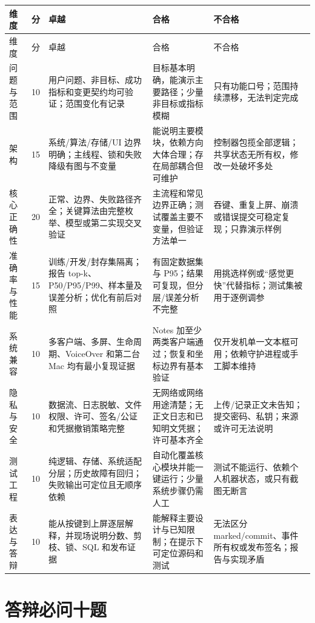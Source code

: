 {\small
\setlength{\tabcolsep}{3pt}
\begin{longtable}{p{2.1cm}p{.8cm}p{3.25cm}p{3.25cm}p{3.25cm}}
\toprule
维度 & 分 & 卓越 & 合格 & 不合格 \\
\midrule
\endfirsthead
\toprule
维度 & 分 & 卓越 & 合格 & 不合格 \\
\midrule
\endhead
问题与范围 & 10 & 用户问题、非目标、成功指标和变更契约均可验证；范围变化有记录 & 目标基本明确，能演示主要路径；少量非目标或指标模糊 & 只有功能口号；范围持续漂移，无法判定完成 \\
架构 & 15 & 系统/算法/存储/UI 边界明确；主线程、锁和失败降级有图与不变量 & 能说明主要模块，依赖方向大体合理；存在局部耦合但可维护 & 控制器包揽全部逻辑；共享状态无所有权，修改一处破坏多处 \\
核心正确性 & 20 & 正常、边界、失败路径齐全；关键算法由完整枚举、模型或第二实现交叉验证 & 主流程和常见边界正确；测试覆盖主要不变量，但验证方法单一 & 吞键、重复上屏、崩溃或错误提交可稳定复现；只靠演示样例 \\
准确率与性能 & 15 & 训练/开发/封存集隔离；报告 top-k、P50/P95/P99、样本量及误差分析；优化有前后对照 & 有固定数据集与 P95；结果可复现，但分层/误差分析不完整 & 用挑选样例或“感觉更快”代替指标；测试集被用于逐例调参 \\
系统兼容 & 10 & 多客户端、多屏、生命周期、VoiceOver 和第二台 Mac 均有最小复现证据 & Notes 加至少两类客户端通过；恢复和坐标边界有基本验证 & 仅开发机单一文本框可用；依赖守护进程或手工脚本维持 \\
隐私与安全 & 10 & 数据流、日志脱敏、文件权限、许可、签名/公证和凭据撤销策略完整 & 无网络或网络用途清楚；无正文日志和已知明文凭据；许可基本齐全 & 上传/记录正文未告知；提交密码、私钥；来源或许可无法说明 \\
测试工程 & 10 & 纯逻辑、存储、系统适配分层；历史故障有回归；失败输出可定位且无顺序依赖 & 自动化覆盖核心模块并能一键运行；少量系统步骤仍需人工 & 测试不能运行、依赖个人机器状态，或只有截图无断言 \\
表达与答辩 & 10 & 能从按键到上屏逐层解释，并现场说明分数、剪枝、锁、SQL 和发布证据 & 能解释主要设计与已知限制；在提示下可定位源码和测试 & 无法区分 marked/commit、事件所有权或发布签名；报告与实现矛盾 \\
\bottomrule
\end{longtable}
}

\section{答辩必问十题}

